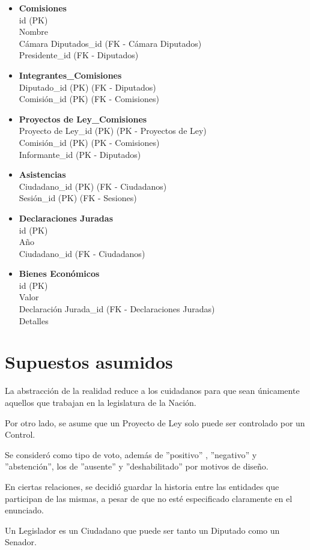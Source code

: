 \begin{itemize}
 	\item \textbf{Comisiones} \\
 	id (PK) \\
 	Nombre \\
 	Cámara Diputados\_id (FK - Cámara Diputados) \\
 	Presidente\_id (FK - Diputados)
 	
	\item \textbf{Integrantes\_Comisiones} \\
	Diputado\_id (PK) (FK - Diputados) \\
	Comisión\_id (PK) (FK - Comisiones) 
	
	\item \textbf{Proyectos de Ley\_Comisiones} \\
	Proyecto de Ley\_id (PK) (PK - Proyectos de Ley) \\
	Comisión\_id (PK) (PK - Comisiones) \\
	Informante\_id (PK - Diputados)
	
	
	\item \textbf{Asistencias} \\
	Ciudadano\_id (PK) (FK - Ciudadanos) \\
	Sesión\_id (PK) (FK - Sesiones)
	
	\item \textbf{Declaraciones Juradas} \\
	id (PK) \\
	Año \\
	Ciudadano\_id (FK - Ciudadanos)
	
	\item \textbf{Bienes Económicos} \\
	id (PK) \\
	Valor \\
	Declaración Jurada\_id (FK - Declaraciones Juradas) \\
	Detalles \\ 
	
\end{itemize}

\newpage

\section{Supuestos asumidos}
La abstracción de la realidad reduce a los cuidadanos para que sean únicamente aquellos que trabajan en la legislatura de la Nación.


Por otro lado, se asume que un Proyecto de Ley solo puede ser controlado por un Control. 


Se consideró como tipo de voto, además de ''positivo'' , ''negativo'' y ''abstención'', los de ''ausente'' y ''deshabilitado'' por motivos de diseño.


En ciertas relaciones, se decidió guardar la historia entre las entidades que participan de las mismas, a pesar de que no esté especificado claramente en el enunciado.


Un Legislador es un Ciudadano que puede ser tanto un Diputado como un Senador.
